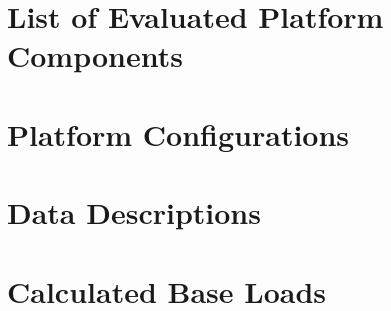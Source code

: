 \chapter{List of Evaluated Platform Components}
\label{chapter:first-appendix}





\chapter{Platform Configurations}
\label{chapter:appendixb}

\chapter{Data Descriptions}
\label{chapter:appendixc}

\chapter{Calculated Base Loads}
\label{chapter:appendixd}


